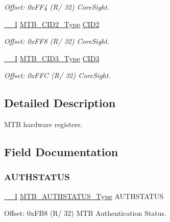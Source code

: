 \begin{DoxyCompactItemize}
\begin{DoxyCompactList}\small\item\em Offset\+: 0x\+F\+F4 (R/ 32) Core\+Sight. \end{DoxyCompactList}\item 
\mbox{\hyperlink{core__cm0plus_8h_af63697ed9952cc71e1225efe205f6cd3}{\+\_\+\+\_\+I}} \mbox{\hyperlink{union_m_t_b___c_i_d2___type}{M\+T\+B\+\_\+\+C\+I\+D2\+\_\+\+Type}} \mbox{\hyperlink{struct_mtb_aa14ff06c97ce5f86f6a1fa1c551d455e}{C\+I\+D2}}
\begin{DoxyCompactList}\small\item\em Offset\+: 0x\+F\+F8 (R/ 32) Core\+Sight. \end{DoxyCompactList}\item 
\mbox{\hyperlink{core__cm0plus_8h_af63697ed9952cc71e1225efe205f6cd3}{\+\_\+\+\_\+I}} \mbox{\hyperlink{union_m_t_b___c_i_d3___type}{M\+T\+B\+\_\+\+C\+I\+D3\+\_\+\+Type}} \mbox{\hyperlink{struct_mtb_ac349d20d31185847fcf8a42f5a6eee0a}{C\+I\+D3}}
\begin{DoxyCompactList}\small\item\em Offset\+: 0x\+F\+FC (R/ 32) Core\+Sight. \end{DoxyCompactList}\end{DoxyCompactItemize}


\subsection{Detailed Description}
M\+TB hardware registers. 

\subsection{Field Documentation}
\mbox{\label{struct_mtb_a4a39125e80e87e5b60ef71e9bd68c4da}} 
\subsubsection{\texorpdfstring{AUTHSTATUS}{AUTHSTATUS}}
{\footnotesize\ttfamily \mbox{\hyperlink{core__cm0plus_8h_af63697ed9952cc71e1225efe205f6cd3}{\+\_\+\+\_\+I}} \mbox{\hyperlink{union_m_t_b___a_u_t_h_s_t_a_t_u_s___type}{M\+T\+B\+\_\+\+A\+U\+T\+H\+S\+T\+A\+T\+U\+S\+\_\+\+Type}} A\+U\+T\+H\+S\+T\+A\+T\+US}



Offset\+: 0x\+F\+B8 (R/ 32) M\+TB Authentication Status. 

